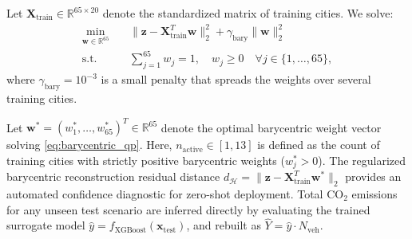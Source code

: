 \documentclass[journal]{IEEEtran}
\begin{document}
Let $\mathbf{X}_{\text{train}} \in \mathbb{R}^{65 \times 20}$ denote the standardized matrix of training cities. We solve:
\begin{equation}
\begin{aligned}
\min_{\mathbf{w} \in \mathbb{R}^{65}} \quad & \| \mathbf{z} - \mathbf{X}_{\text{train}}^T \mathbf{w} \|_2^2 + \gamma_{\text{bary}} \| \mathbf{w} \|_2^2 \\
\text{s.t.} \quad & \sum_{j=1}^{65} w_j = 1, \quad w_j \ge 0 \quad \forall j \in \{1, \dots, 65\},
\end{aligned}
\label{eq:barycentric_qp}
\end{equation}
where $\gamma_{\text{bary}} = 10^{-3}$ is a small penalty that spreads the weights over several training cities.

Let $\mathbf{w}^* = (w_1^*, \dots, w_{65}^*)^T \in \mathbb{R}^{65}$ denote the optimal barycentric weight vector solving \eqref{eq:barycentric_qp}. Here, $n_{\text{active}} \in [1, 13]$ is defined as the count of training cities with strictly positive barycentric weights ($w_j^* > 0$). The regularized barycentric reconstruction residual distance $d_{\mathcal{H}} = \| \mathbf{z} - \mathbf{X}_{\text{train}}^T \mathbf{w}^* \|_2$ provides an automated confidence diagnostic for zero-shot deployment. Total $\text{CO}_2$ emissions for any unseen test scenario are inferred directly by evaluating the trained surrogate model $\hat{y} = f_{\text{XGBoost}}(\mathbf{x}_{\text{test}})$, and rebuilt as $\hat{Y} = \hat{y} \cdot N_{\text{veh}}$.
\end{document}
